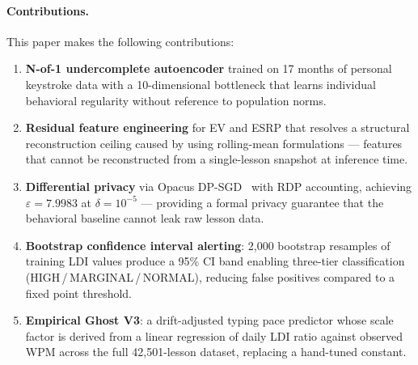 \paragraph{Contributions.} This paper makes the following contributions:

\begin{enumerate}
  \item \textbf{N-of-1 undercomplete autoencoder} trained on 17 months of
        personal keystroke data with a 10-dimensional bottleneck that learns
        individual behavioral regularity without reference to population norms.

  \item \textbf{Residual feature engineering} for EV and ESRP that resolves a
        structural reconstruction ceiling caused by using rolling-mean
        formulations — features that cannot be reconstructed from a single-lesson
        snapshot at inference time.

  \item \textbf{Differential privacy} via Opacus DP-SGD~\cite{yousefpour2021opacus}
        with RDP accounting, achieving \(\varepsilon{=}7.9983\) at
        \(\delta{=}10^{-5}\) — providing a formal privacy guarantee that the
        behavioral baseline cannot leak raw lesson data.

  \item \textbf{Bootstrap confidence interval alerting}: 2,000 bootstrap
        resamples of training LDI values produce a 95\% CI band enabling
        three-tier classification (HIGH\,/\,MARGINAL\,/\,NORMAL), reducing
        false positives compared to a fixed point threshold.

  \item \textbf{Empirical Ghost V3}: a drift-adjusted typing pace predictor
        whose scale factor is derived from a linear regression of daily LDI
        ratio against observed WPM across the full 42,501-lesson dataset,
        replacing a hand-tuned constant.
\end{enumerate}
